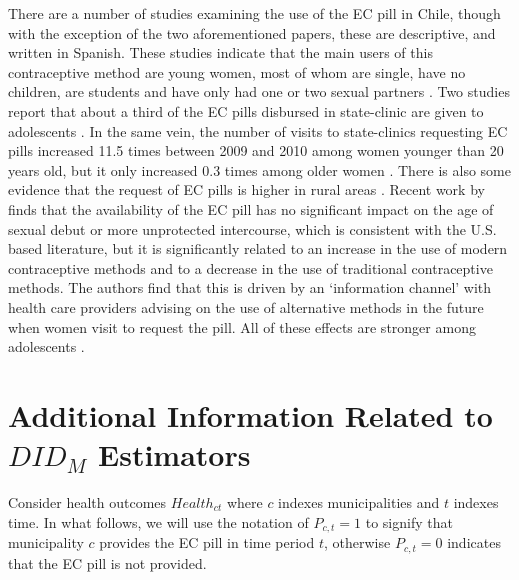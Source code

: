\documentclass[12pt]{article}
\begin{document}
There are a number of studies examining the use of the EC pill in Chile, though with the exception of the two aforementioned papers, these are descriptive, and written in Spanish. These studies indicate that the main users of this contraceptive method are young women, most of whom are single, have no children, are students and have only had one or two sexual partners \citep{Escobaretal2008}. Two studies report that about a third of the EC pills disbursed in state-clinic are given to adolescents \citep{Schiappacasseetal2014,MoranFaundes2013}. In the same vein, the number of visits to state-clinics requesting EC pills increased 11.5 times between 2009 and 2010 among women younger than 20 years old, but it only increased 0.3 times among older women \citep{Lavanderosetal2016}. There is also some evidence that the request of EC pills is higher in rural areas \citep{MoranFaundes2013}. Recent work by \citet{NuevoChiqueroPino2019} finds that the availability of the EC pill has no significant impact on the age of sexual debut or more unprotected intercourse, which is consistent with the U.S. based literature, but it is significantly related to an increase in the use of modern contraceptive methods and to a decrease in the use of traditional contraceptive methods. The authors find that this is driven by an `information channel' with health care providers advising on the use of alternative methods in the future when women visit to request the pill.  All of these effects are stronger among adolescents \citep{NuevoChiqueroPino2019}.

  

\section{Additional Information Related to $DID_M$ Estimators}
\label{AScn:DIDM}
Consider health outcomes $Health_{ct}$ where $c$ indexes municipalities and $t$ indexes time.  In what follows, we will use the notation of $P_{c,t}=1$ to signify that municipality $c$ provides the EC pill in time period $t$, otherwise $P_{c,t}=0$ indicates that the EC pill is not provided.   
\end{document}
